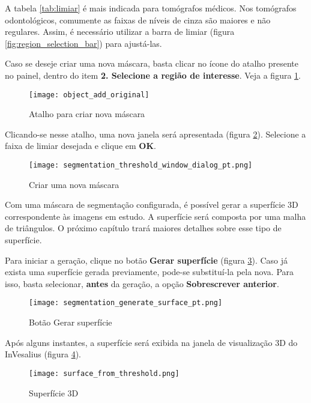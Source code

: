 A tabela \ref{tab:limiar} é mais indicada para tomógrafos médicos. Nos tomógrafos odontológicos,
comumente as faixas de níveis de cinza são maiores e não regulares. Assim, é necessário utilizar
a barra de limiar (figura \ref{fig:region_selection_bar}) para ajustá-las.

Caso se deseje criar uma nova máscara, basta clicar no ícone do atalho presente no painel, dentro
do item \textbf{2. Selecione a região de interesse}. Veja a figura \ref{fig:shortcut_new_mask}.

\begin{figure}[!htb]
\centering
\texttt{[image: object\_add\_original]}
\caption{Atalho para criar nova máscara}
\label{fig:shortcut_new_mask}
\end{figure}

Clicando-se nesse atalho, uma nova janela será apresentada (figura \ref{fig:create_new_mask}).
Selecione a faixa de limiar desejada e clique em \textbf{OK}.

\begin{figure}[!htb]
\centering
\texttt{[image: segmentation\_threshold\_window\_dialog\_pt.png]}
\caption{Criar uma nova máscara}
\label{fig:create_new_mask}
\end{figure}

\newpage

Com uma máscara de segmentação configurada, é possível gerar a superfície 3D correspondente
às imagens em estudo. A superfície será composta por uma malha de triângulos. O próximo capítulo
trará maiores detalhes sobre esse tipo de superfície.

Para iniciar a geração, clique no botão \textbf{Gerar superfície} (figura \ref{fig:generate_surface}).
Caso já exista uma superfície gerada previamente, pode-se substituí-la pela nova. Para isso, basta
selecionar, \textbf{antes} da geração, a opção \textbf{Sobrescrever anterior}.

\begin{figure}[!htb]
\centering
\texttt{[image: segmentation\_generate\_surface\_pt.png]}
\caption{Botão Gerar superfície}
\label{fig:generate_surface}
\end{figure}

Após alguns instantes, a superfície será exibida na janela de visualização 3D do InVesalius
(figura \ref{fig:surface}).

\begin{figure}[!htb]
\centering
\texttt{[image: surface\_from\_threshold.png]}
\caption{Superfície 3D}
\label{fig:surface}
\end{figure}
 


